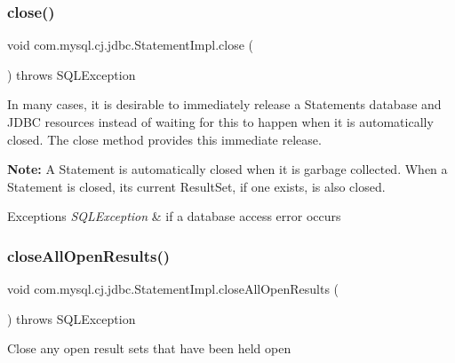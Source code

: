 \subsubsection{\texorpdfstring{close()}{close()}}
{\footnotesize\ttfamily void com.\+mysql.\+cj.\+jdbc.\+Statement\+Impl.\+close (\begin{DoxyParamCaption}{ }\end{DoxyParamCaption}) throws S\+Q\+L\+Exception}

In many cases, it is desirable to immediately release a Statement\textquotesingle{}s database and J\+D\+BC resources instead of waiting for this to happen when it is automatically closed. The close method provides this immediate release.

{\bfseries Note\+:} A Statement is automatically closed when it is garbage collected. When a Statement is closed, its current Result\+Set, if one exists, is also closed. 


\begin{DoxyExceptions}{Exceptions}
{\em S\+Q\+L\+Exception} & if a database access error occurs \\
\hline
\end{DoxyExceptions}
\mbox{\label{classcom_1_1mysql_1_1cj_1_1jdbc_1_1_statement_impl_a471a61331072cf89533c58507ad21719}} 
\subsubsection{\texorpdfstring{close\+All\+Open\+Results()}{closeAllOpenResults()}}
{\footnotesize\ttfamily void com.\+mysql.\+cj.\+jdbc.\+Statement\+Impl.\+close\+All\+Open\+Results (\begin{DoxyParamCaption}{ }\end{DoxyParamCaption}) throws S\+Q\+L\+Exception\hspace{0.3cm}{\ttfamily [protected]}}

Close any open result sets that have been \textquotesingle{}held open\textquotesingle{} \mbox{\label{classcom_1_1mysql_1_1cj_1_1jdbc_1_1_statement_impl_a4a514bb3e111c30e6b376b74bb8f78e8}} 
